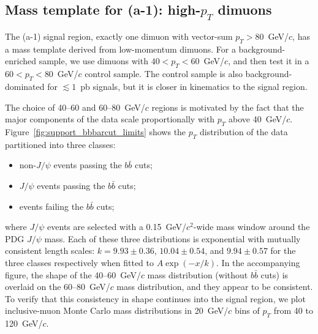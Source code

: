 \documentclass[12pt]{cms-tdr}
\begin{document}
\subsection{Mass template for (a-1): high-$p_T$ dimuons}

The (a-1) signal region, exactly one dimuon with vector-sum $p_T >
80$~GeV/$c$, has a mass template derived from low-momentum dimuons.
For a background-enriched sample, we use dimuons with $40 < p_T <
60$~GeV/$c$, and then test it in a $60 < p_T < 80$~GeV/$c$ control
sample.  The control sample is also background-dominated for $\lesssim
1$~pb signals, but it is closer in kinematics to the signal region.

The choice of 40--60 and 60--80~GeV/$c$ regions is motivated by the
fact that the major components of the data scale proportionally with
$p_T$ above 40~GeV/$c$.  Figure~\ref{fig:support_bbbarcut_limits}
shows the $p_T$ distribution of the data partitioned into three
classes:
\begin{itemize}
\item non-$J/\psi$ events passing the $b\bar{b}$ cuts;
\item $J/\psi$ events passing the $b\bar{b}$ cuts;
\item events failing the $b\bar{b}$ cuts;
\end{itemize}
where $J/\psi$ events are selected with a 0.15~GeV/$c^2$-wide mass
window around the PDG $J/\psi$ mass.  Each of these three
distributions is exponential with mutually consistent length scales:
$k = 9.93\pm0.36$, $10.04\pm0.54$, and $9.94\pm0.57$ for the three
classes respectively when fitted to $A\exp(-x/k)$.  In the
accompanying figure, the shape of the 40--60~GeV/$c$ mass distribution
(without $b\bar{b}$ cuts) is overlaid on the 60--80~GeV/$c$ mass
distribution, and they appear to be consistent.  To verify that this
consistency in shape continues into the signal region, we plot
inclusive-muon Monte Carlo mass distributions in 20~GeV/$c$ bins of
$p_T$ from 40 to 120~GeV/$c$.
\end{document}
